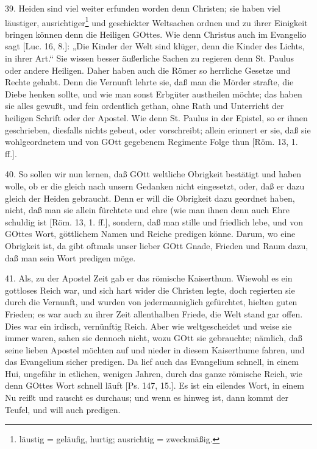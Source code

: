 39. Heiden sind viel weiter erfunden worden denn Christen; sie haben viel läustiger, ausrichtiger\footnote{läustig = geläufig, hurtig; ausrichtig = zweckmäßig.} und geschickter Weltsachen ordnen und zu ihrer Einigkeit bringen können denn die Heiligen GOttes. Wie denn Christus auch im Evangelio sagt [Luc. 16, 8.]: „Die Kinder der Welt sind klüger, denn die Kinder des Lichts, in ihrer Art.“ Sie wissen besser äußerliche Sachen zu regieren denn St. Paulus oder andere Heiligen. Daher haben auch die Römer so herrliche Gesetze und Rechte gehabt. Denn die Vernunft lehrte sie, daß man die Mörder strafte, die Diebe henken sollte, und wie man sonst Erbgüter austheilen möchte; das haben sie alles gewußt, und fein ordentlich gethan, ohne Rath und Unterricht der heiligen Schrift oder der Apostel. Wie denn St. Paulus in der Epistel, so er ihnen geschrieben, diesfalls nichts gebeut, oder vorschreibt; allein erinnert er sie, daß sie wohlgeordnetem und von GOtt gegebenem Regimente Folge thun [Röm. 13, 1. ff.].

40. So sollen wir nun lernen, daß GOtt weltliche Obrigkeit bestätigt und haben wolle, ob er die gleich nach unsern Gedanken nicht eingesetzt, oder, daß er dazu gleich der Heiden gebraucht. Denn er will die Obrigkeit dazu geordnet haben, nicht, daß man sie allein fürchtete und ehre (wie man ihnen denn auch Ehre schuldig
ist [Röm. 13, 1. ff.], sondern, daß man stille und friedlich lebe, und von GOttes Wort, göttlichem Namen und Reiche predigen könne. Darum, wo eine Obrigkeit ist, da gibt oftmals unser lieber GOtt Gnade, Frieden und Raum dazu, daß man sein Wort predigen möge.

41. Als, zu der Apostel Zeit gab er das römische Kaiserthum. Wiewohl es ein gottloses Reich war, und sich hart wider die Christen legte, doch regierten sie durch die Vernunft, und wurden von jedermanniglich gefürchtet, hielten guten Frieden; es war auch zu ihrer Zeit allenthalben Friede, die Welt stand gar offen. Dies war ein irdisch, vernünftig Reich. Aber wie weltgescheidet und weise sie immer waren, sahen sie dennoch nicht, wozu GOtt sie gebrauchte; nämlich, daß seine lieben Apostel möchten auf und nieder in diesem Kaiserthume fahren, und das Evangelium sicher predigen. Da lief auch das Evangelium schnell, in einem Hui, ungefähr in etlichen, wenigen Jahren, durch das ganze römische Reich, wie denn GOttes Wort schnell läuft [Ps. 147, 15.]. Es ist ein eilendes Wort, in einem Nu reißt und rauscht es durchaus; und wenn es hinweg ist, dann kommt der Teufel, und will auch predigen.


